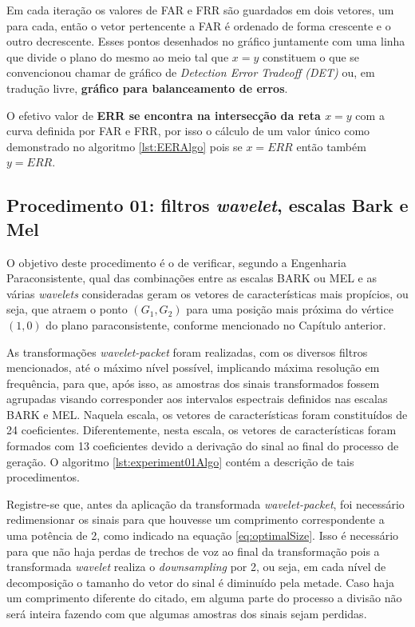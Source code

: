 		\par Em cada iteração os valores de FAR e FRR são guardados em dois vetores, um para cada, então o vetor pertencente a FAR é ordenado de forma crescente e o outro decrescente. Esses pontos desenhados no gráfico juntamente com uma linha que divide o plano do mesmo ao meio tal que $x=y$ constituem o que se convencionou chamar de gráfico de \textit{Detection Error Tradeoff (DET)} ou, em tradução livre, \textbf{gráfico para balanceamento de erros}.
		
		\par O efetivo valor de \textbf{ERR se encontra na intersecção da reta $x=y$} com a curva definida por FAR e FRR, por isso o cálculo de um valor único como demonstrado no algoritmo \ref{lst:EERAlgo} pois se $x=ERR$ então também $y=ERR$.
	
		
	
		\subsection{Procedimento 01: filtros \textit{wavelet}, escalas Bark e Mel}
		\label{chap:propApproach:sec:Experimento01}
		\par O objetivo deste procedimento é o de verificar, segundo a Engenharia Paraconsistente, qual das combinações entre as escalas BARK ou MEL e as várias \textit{wavelets} consideradas geram os vetores de características mais propícios, ou seja, que atraem o ponto $(G_1,G_2)$ para uma posição mais próxima do vértice $(1,0)$ do plano paraconsistente, conforme mencionado no Capítulo anterior. 
				
		\par As transformações \textit{wavelet-packet} foram realizadas, com os diversos filtros mencionados, até  o máximo nível possível, implicando máxima resolução em frequência, para que, após isso, as amostras dos sinais transformados fossem agrupadas visando corresponder aos intervalos espectrais definidos nas escalas BARK e MEL. Naquela escala, os vetores de características foram constituídos de 24 coeficientes. Diferentemente, nesta escala, os vetores de características foram formados com 13 coeficientes devido a derivação do sinal ao final do processo de geração. O algoritmo \ref{lst:experiment01Algo} contém a descrição de tais procedimentos.
			
		

		\par Registre-se que, antes da aplicação da transformada \textit{wavelet-packet}, foi necessário redimensionar os sinais para que houvesse um comprimento correspondente a uma potência de 2, como indicado na equação \ref{eq:optimalSize}. Isso é necessário para que não haja perdas de trechos de voz ao final da transformação pois a transformada \textit{wavelet} realiza o \textit{downsampling} por 2, ou seja, em cada nível de decomposição o tamanho do vetor do sinal é diminuído pela metade. Caso haja um comprimento diferente do citado, em alguma parte do processo a divisão não será inteira fazendo com que algumas amostras dos sinais sejam perdidas.
				
